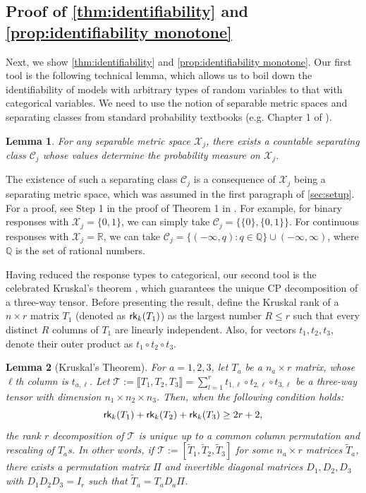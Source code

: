 \documentclass[10pt]{article} %
\newtheorem{lemma}{Lemma}
\newcommand{\rk}{\textsf{\upshape rk}}
\def\tilde{\widetilde}
\begin{document}
\subsection{Proof of \cref{thm:identifiability} and \cref{prop:identifiability monotone}}
Next, we show \cref{thm:identifiability} and \cref{prop:identifiability monotone}. 
Our first tool is the following technical lemma, which allows us to boil down the identifiability of models with arbitrary types of random variables to that with categorical variables. 
%
We need to use the notion of separable metric spaces and separating classes from standard probability textbooks (e.g. Chapter 1 of \cite{billingsley2013convergence}).

\begin{lemma}\label{lem:separating class}
    For any separable metric space $\mathcal{X}_j$, there exists a countable separating class $\mathcal{C}_j$ whose values determine the probability measure on $\mathcal{X}_j$.
\end{lemma}
The existence of such a separating class $\mathcal{C}_j$ is a consequence of $\mathcal{X}_j$ being a separating metric space, which was assumed in the first paragraph of \cref{sec:setup}. For a proof, see Step 1 in the proof of Theorem 1 in \cite{lee2024new}. For example, for binary responses with $\mathcal{X}_j = \{0,1\}$, we can simply take $\mathcal{C}_j = \{\{0\}, \{0,1\}\}$. For continuous responses with $\mathcal{X}_j = \mathbb{R}$, we can take $\mathcal{C}_j = \{(-\infty, q): q \in \mathbb{Q}\} \cup (-\infty, \infty)$, where $\mathbb{Q}$ is the set of rational numbers.

Having reduced the response types to categorical, our second tool is the celebrated Kruskal's theorem \citep{kruskal1977three, rhodes2010concise}, which guarantees the unique CP decomposition of a three-way tensor. Before presenting the result, define the Kruskal rank of a $n \times r$ matrix $T_1$ (denoted as $\rk_k(T_1)$) as the largest number $R \le r$ such that every distinct $R$ columns of $T_1$ are linearly independent. Also, for vectors $t_1, t_2, t_3$, denote their outer product as $t_1 \circ t_2 \circ t_3$.

\begin{lemma}[Kruskal's Theorem]\label{lem:kruskal}
    For $a = 1,2,3$, let $T_a$ be a $n_a \times r$ matrix, whose $\ell$th column is $t_{a,\ell}$. Let $\mathcal{T} := \llbracket T_1, T_2, T_3 \rrbracket = \sum_{l=1}^r t_{1,\ell} \circ t_{2,\ell} \circ t_{3,\ell}$ be a three-way tensor with dimension $n_1 \times n_2 \times n_3$. Then, when the following condition holds:
    $$\rk_k(T_1) + \rk_k(T_2) + \rk_k(T_3) \ge 2r +2,$$
    the rank $r$ decomposition of $\mathcal{T}$ is unique up to a common column permutation and rescaling of $T_a$s. In other words, if $\mathcal{T} := [\tilde{T}_1, \tilde{T}_2, \tilde{T}_3]$ for some $n_a \times r$ matrices $\tilde{T}_a$, there exists a permutation matrix $\Pi$ and invertible diagonal matrices $D_1, D_2, D_3$ with $D_1 D_2 D_3 = I_r$ such that $\tilde{T}_a = T_a D_a \Pi$.
\end{lemma}
\end{document}
